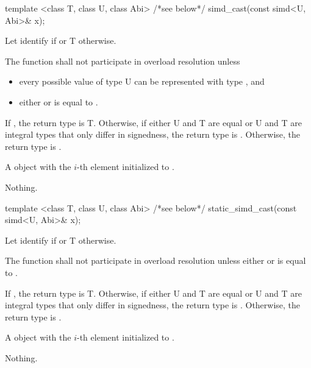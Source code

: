 \begin{itemdecl}
template <class T, class U, class Abi> /*see below*/ simd_cast(const simd<U, Abi>& x);
\end{itemdecl}
\begin{itemdescr}
  \pnum\remarks Let  identify  if  or \type T otherwise.

  \pnum\remarks The function shall not participate in overload resolution unless
  \begin{itemize}
    \item every possible value of type \type U can be represented with type , and
    \item either  or  is equal to .
  \end{itemize}

  \pnum\remarks If , the return type is \type T.
  Otherwise, if either \type U and \type T are equal or \type U and \type T are integral types that only differ in signedness, the return type is \simd[<T, Abi>].
  Otherwise, the return type is .

  \pnum\returns A \simd object with the $i$-th element initialized to .

  \pnum\throws Nothing.
\end{itemdescr}

\begin{itemdecl}
template <class T, class U, class Abi> /*see below*/ static_simd_cast(const simd<U, Abi>& x);
\end{itemdecl}
\begin{itemdescr}
  \pnum\remarks Let  identify  if  or \type T otherwise.

  \pnum\remarks The function shall not participate in overload resolution unless either  or  is equal to .

  \pnum\remarks If , the return type is \type T.
  Otherwise, if either \type U and \type T are equal or \type U and \type T are integral types that only differ in signedness, the return type is \simd[<T, Abi>].
  Otherwise, the return type is .

  \pnum\returns A \simd object with the $i$-th element initialized to .

  \pnum\throws Nothing.
\end{itemdescr}

